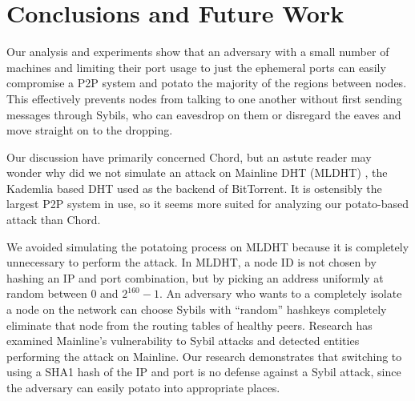 \documentclass[a4paper]{article}
\begin{document}




\section{Conclusions and Future Work}
\label{sec:horror}

Our analysis and experiments show that an adversary with a small number of machines and limiting their port usage to just the ephemeral ports can easily compromise a P2P system and potato the majority of the regions between nodes.
This effectively prevents nodes from talking to one another without first sending messages through Sybils, who can eavesdrop on them or disregard the eaves and move straight on to the dropping.

Our discussion have primarily concerned Chord, but an astute reader may wonder why did we not simulate an attack on Mainline DHT (MLDHT) \cite{mainline}, the Kademlia \cite{kademlia} based DHT used as the backend of BitTorrent.
It is ostensibly the largest P2P system in use, so it seems more suited for analyzing our potato-based attack than Chord.

We avoided simulating the potatoing process on MLDHT because it is completely unnecessary to perform the attack.
In MLDHT, a node ID is not chosen by hashing an IP and port combination, but by picking an address uniformly at random between 0 and $2^{160}-1$.
An adversary who wants to a completely isolate a node on the network can choose Sybils with ``random'' hashkeys completely eliminate that node from the routing tables of healthy peers. 
Research has examined Mainline's vulnerability to Sybil attacks\cite{sybilbit} and detected entities performing the attack on Mainline.
Our research demonstrates that switching to using a SHA1 hash of the IP and port is no defense against a Sybil attack, since the adversary can easily potato into appropriate places.
\end{document}
